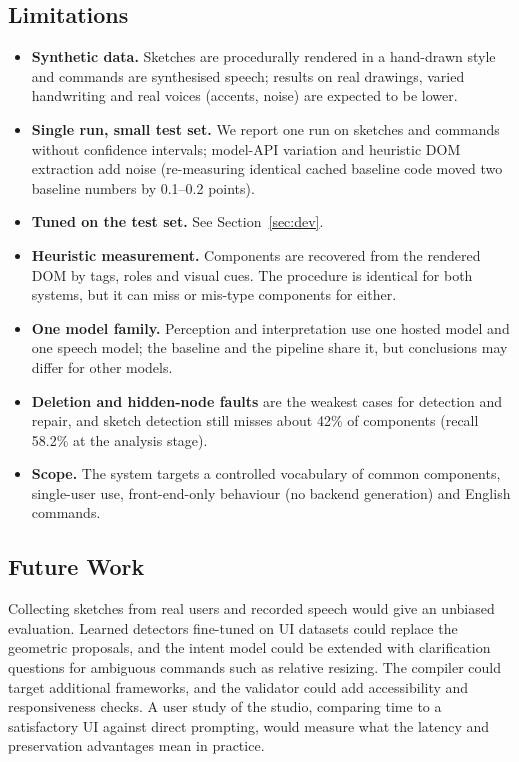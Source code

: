 \subsection{Limitations}
\label{sec:limits}
\begin{itemize}
\item \textbf{Synthetic data.} Sketches are procedurally rendered in a hand-drawn style and commands are synthesised speech; results on real drawings, varied handwriting and real voices (accents, noise) are expected to be lower.
\item \textbf{Single run, small test set.} We report one run on \CountSketches{} sketches and \CountCommands{} commands without confidence intervals; model-API variation and heuristic DOM extraction add noise (re-measuring identical cached baseline code moved two baseline numbers by 0.1--0.2 points).
\item \textbf{Tuned on the test set.} See Section~\ref{sec:dev}.
\item \textbf{Heuristic measurement.} Components are recovered from the rendered DOM by tags, roles and visual cues. The procedure is identical for both systems, but it can miss or mis-type components for either.
\item \textbf{One model family.} Perception and interpretation use one hosted model and one speech model; the baseline and the pipeline share it, but conclusions may differ for other models.
\item \textbf{Deletion and hidden-node faults} are the weakest cases for detection and repair, and sketch detection still misses about 42\% of components (recall 58.2\% at the analysis stage).
\item \textbf{Scope.} The system targets a controlled vocabulary of common components, single-user use, front-end-only behaviour (no backend generation) and English commands.
\end{itemize}

\subsection{Future Work}
Collecting sketches from real users and recorded speech would give an unbiased evaluation. Learned detectors fine-tuned on UI datasets could replace the geometric proposals, and the intent model could be extended with clarification questions for ambiguous commands such as relative resizing. The compiler could target additional frameworks, and the validator could add accessibility and responsiveness checks. A user study of the studio, comparing time to a satisfactory UI against direct prompting, would measure what the latency and preservation advantages mean in practice.

